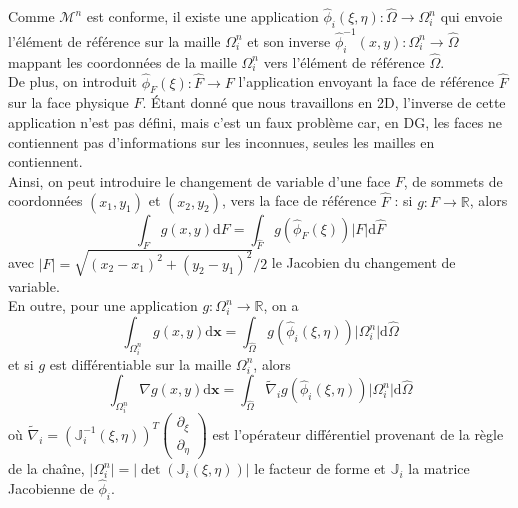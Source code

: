\documentclass[11pt, a4paper, oneside]{report}
\begin{document}
\begin{samepage}
Comme $\mathcal{M}^n$ est conforme, il existe une application $\widehat{\phi}_i(\xi, \eta) : \widehat{\Omega} \longrightarrow \Omega_i^n$ qui envoie l'élément de référence sur la maille $\Omega_i^n$ et son inverse $\widehat{\phi}_i^{-1}(x, y) : \Omega_i^n \longrightarrow \widehat{\Omega}$ mappant les coordonnées de la maille $\Omega_i^n$ vers l'élément de référence $\widehat{\Omega}$. \\
De plus, on introduit $\widehat{\phi}_F(\xi) : \widehat{F} \longrightarrow F$ l'application envoyant la face de référence $\widehat{F}$ sur la face physique $F$. Étant donné que nous travaillons en 2D, l'inverse de cette application n'est pas défini, mais c'est un faux problème car, en DG, les faces ne contiennent pas d'informations sur les inconnues, seules les mailles en contiennent. \\
Ainsi, on peut introduire le changement de variable d'une face $F$, de sommets de coordonnées $(x_1, y_1)$ et $(x_2, y_2)$, vers la face de référence $\widehat{F}$ : si $g : F \longrightarrow \mathbb{R}$, alors
\begin{equation}
    \int_F g(x, y) \text{d}F = \int_{\widehat{F}} g(\widehat{\phi}_F(\xi)) \lvert F \rvert \text{d}\widehat{F}
\end{equation}
avec $\lvert F \rvert = \sqrt{(x_2 - x_1)^2 + (y_2 - y_1)^2}/2$ le Jacobien du changement de variable. \\
En outre, pour une application $g : \Omega_i^n \longrightarrow \mathbb{R}$, on a
\begin{equation}
    \int_{\Omega_i^n} g(x, y) \text{d}\bm{x} = \int_{\widehat{\Omega}} g(\widehat{\phi}_i(\xi, \eta)) \lvert \Omega_i^n \rvert \text{d}\widehat{\Omega}
\end{equation}
et si $g$ est différentiable sur la maille $\Omega_i^n$, alors
\begin{equation}
    \int_{\Omega_i^n} \nabla g(x, y) \text{d}\bm{x} = \int_{\widehat{\Omega}} \widetilde{\nabla}_i g(\widehat{\phi}_i(\xi, \eta)) \lvert \Omega_i^n \rvert \text{d}\widehat{\Omega}
\end{equation}
où $\displaystyle \widetilde{\nabla}_i = \left( \mathbb{J}_i^{-1}(\xi, \eta) \right)^T \begin{pmatrix} \partial_\xi \\ \partial_\eta \end{pmatrix}$ est l'opérateur différentiel provenant de la règle de la chaîne, ${\displaystyle \lvert \Omega_i^n \rvert = \left| \det \left( \mathbb{J}_i(\xi, \eta) \right) \right|}$ le facteur de forme et $\mathbb{J}_i$ la matrice Jacobienne de $\widehat{\phi}_i$.
\end{samepage}
\end{document}
